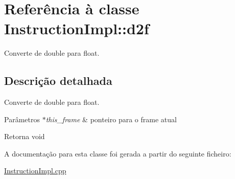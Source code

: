 \hypertarget{class_instruction_impl_1_1d2f}{}\section{Referência à classe Instruction\+Impl\+:\+:d2f}
\label{class_instruction_impl_1_1d2f}


Converte de double para float.  




\subsection{Descrição detalhada}
Converte de double para float. 


\begin{DoxyParams}{Parâmetros}
{\em $\ast$this\+\_\+frame} & ponteiro para o frame atual \\
\hline
\end{DoxyParams}
\begin{DoxyReturn}{Retorna}
void 
\end{DoxyReturn}


A documentação para esta classe foi gerada a partir do seguinte ficheiro\+:\begin{DoxyCompactItemize}
\item 
\hyperlink{_instruction_impl_8cpp}{Instruction\+Impl.\+cpp}\end{DoxyCompactItemize}
